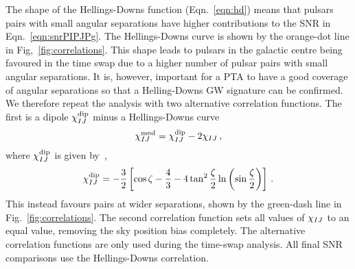 The shape of the Hellings-Downs function (Eqn.~\ref{eqn:hd}) means that pulsars pairs with small angular separations have higher contributions to the SNR in Eqn.~\ref{eqn:snrPIPJPg}. 
The Hellings-Downs curve is shown by the orange-dot line in Fig,~\ref{fig:correlations}.
This shape leads to pulsars in the galactic centre being favoured in the time swap due to a higher number of pulsar pairs with small angular separations.
It is, however, important for a PTA to have a good coverage of angular separations so that a Helling-Downs GW signature can be confirmed. 
We therefore repeat the analysis with two alternative correlation functions.
The first is a dipole $\chi_{IJ}^{\rm dip}$ minus a Hellings-Downs curve
\begin{equation}
\chi_{IJ}^{\rm mod} = \chi_{IJ}^{\rm dip} - 2 \chi_{IJ}\,,
\label{eqn:chimod}
\end{equation}
where $\chi_{IJ}^{\rm dip}$ is given by~\citep{AnholmEtAl:2009},
\begin{equation}
\chi_{IJ}^{\rm dip} = -\frac{3}{2}
            \left[ \cos \zeta - \frac{4}{3} - 4 \tan^2 \frac{\zeta}{2} 
                   \ln \left( \sin \frac{\zeta}{2} \right) \right]\,.
\label{eqn:dip}
\end{equation}
This instead favours pairs at wider separations, shown by the green-dash line in Fig.~\ref{fig:correlations}.
The second correlation function sets all values of $\chi_{IJ}$ to an equal value, removing the sky position bias completely. 
The alternative correlation functions are only used during the time-swap analysis. 
All final SNR comparisons use the Hellings-Downs correlation. 







